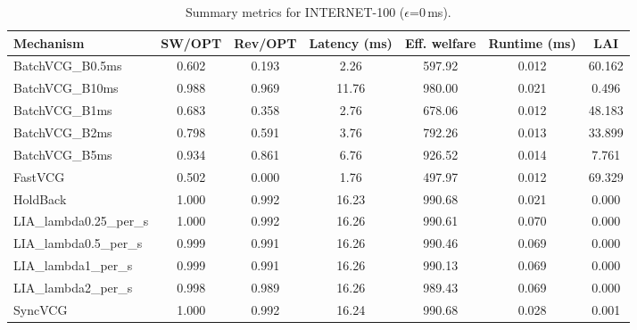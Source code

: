 \begin{table}[t]
\centering
\small
\setlength{\tabcolsep}{6pt}
\begin{tabular}{lcccccc}
\toprule
Mechanism & SW/OPT & Rev/OPT & Latency (ms) & Eff. welfare & Runtime (ms) & LAI \\
\midrule
BatchVCG_B0.5ms & 0.602 & 0.193 & 2.26 & 597.92 & 0.012 & 60.162 \\
BatchVCG_B10ms & 0.988 & 0.969 & 11.76 & 980.00 & 0.021 & 0.496 \\
BatchVCG_B1ms & 0.683 & 0.358 & 2.76 & 678.06 & 0.012 & 48.183 \\
BatchVCG_B2ms & 0.798 & 0.591 & 3.76 & 792.26 & 0.013 & 33.899 \\
BatchVCG_B5ms & 0.934 & 0.861 & 6.76 & 926.52 & 0.014 & 7.761 \\
FastVCG & 0.502 & 0.000 & 1.76 & 497.97 & 0.012 & 69.329 \\
HoldBack & 1.000 & 0.992 & 16.23 & 990.68 & 0.021 & 0.000 \\
LIA_lambda0.25_per_s & 1.000 & 0.992 & 16.26 & 990.61 & 0.070 & 0.000 \\
LIA_lambda0.5_per_s & 0.999 & 0.991 & 16.26 & 990.46 & 0.069 & 0.000 \\
LIA_lambda1_per_s & 0.999 & 0.991 & 16.26 & 990.13 & 0.069 & 0.000 \\
LIA_lambda2_per_s & 0.998 & 0.989 & 16.26 & 989.43 & 0.069 & 0.000 \\
SyncVCG & 1.000 & 0.992 & 16.24 & 990.68 & 0.028 & 0.001 \\
\bottomrule
\end{tabular}
\caption{Summary metrics for INTERNET-100 ($\epsilon$=0\,ms).}
\label{tab:internet100_eps0p0}
\end{table}
